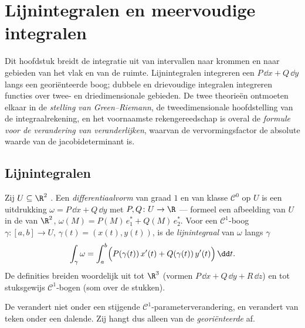 \chapter{Lijnintegralen en meervoudige integralen}\label{ch:b2:multint}

Dit hoofdstuk breidt de integratie uit van intervallen naar krommen
en naar gebieden van het vlak en van de ruimte. Lijnintegralen
integreren een \emph{} $P\,\dd x + Q\,\dd y$ langs
een georiënteerde boog; dubbele en drievoudige integralen
integreren functies over twee- en driedimensionale gebieden. De
twee theorieën ontmoeten elkaar in de \emph{stelling van
Green--Riemann}, de tweedimensionale hoofdstelling van de
integraalrekening, en het voornaamste rekengereedschap is overal de
\emph{formule voor de verandering van veranderlijken}, waarvan de
vervormingsfactor de absolute waarde van de jacobideterminant is.

\section{Lijnintegralen}

\begin{definition}\label{def:b2:multint:lineint}
Zij $U \subseteq \R^2$ . Een
\emph{differentiaalvorm} van graad $1$ en
van klasse $\mathcal{C}^0$ op $U$ is een uitdrukking $\omega =
P\,\dd x + Q\,\dd y$ met $P, Q \colon U \to \R$  ---
formeel een  afbeelding van $U$ in de  van
$\R^2$, $\omega(M) = P(M)\,e_1^* + Q(M)\,e_2^*$. Voor een
$\mathcal{C}^1$-boog $\gamma \colon [a, b] \to U$, $\gamma(t) =
(x(t), y(t))$, is de \emph{lijnintegraal} van
$\omega$ langs $\gamma$
\[
\int_\gamma \omega
= \int_a^b \Bigl(P(\gamma(t))\,x'(t)
+ Q(\gamma(t))\,y'(t)\Bigr)\,\dd t .
\]
De definities breiden woordelijk uit tot $\R^3$ (vormen $P\,\dd x +
Q\,\dd y + R\,\dd z$) en tot stuksgewijs $\mathcal{C}^1$-bogen (som
over de stukken).
\end{definition}

\begin{proposition}\label{prop:b2:multint:lineinv}
De  verandert niet onder een stijgende
$\mathcal{C}^1$-parameterverandering, en verandert van teken onder
een dalende. Zij hangt dus alleen van de \emph{georiënteerde}
 af.
\end{proposition}

